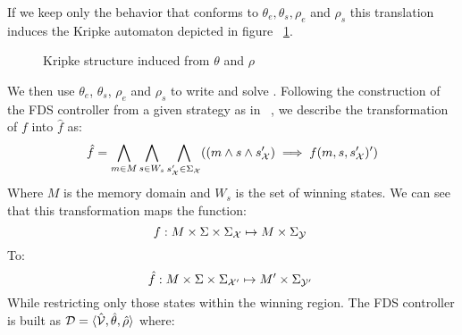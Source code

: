 \vspace{1em}
\normalsize

If we keep only the behavior that conforms to $\theta_e, \theta_s, \rho_e$ and $\rho_s$ this translation induces the Kripke automaton depicted in figure ~\ref{fig:clts_to_fds_K}.

\begin{figure}[bt]
	\centering
	\caption{Kripke structure induced from $\theta$ and $\rho$}
	\label{fig:clts_to_fds_K}
\end{figure}

We then use $\theta_e$, $\theta_s$, $\rho_e$ and $\rho_s$ to write \varphiLTL and solve \fdsEmbeddingDef. Following the construction of the FDS controller from a given strategy as in ~\cite{bloem2012synthesis}, we describe the transformation of $f$ into $\hat{f}$ as:
\[\hat{f} = \bigwedge_{m \in M}\bigwedge_{s \in W_s}\bigwedge_{s'_{{\mathcal{X}}} \in \Sigma_{{\mathcal{X}}}} ((m \wedge s \wedge s'_{{\mathcal{X}}})\implies f(m,s,s'_{{\mathcal{X}}})')\]
Where $M$ is the memory domain and $W_s$ is the set of winning states. We can see that this transformation maps the function:
\[f: M \times \Sigma \times \Sigma_{{\mathcal{X}}} \mapsto M \times \Sigma_{{\mathcal{Y}}}\ \]
To:
\[\hat{f}: M \times \Sigma \times \Sigma_{{\mathcal{X}}'} \mapsto M' \times \Sigma_{{\mathcal{Y}}'}\ \]
While restricting only those states within the winning region.
The FDS controller is built as $\mathcal{D} = \langle \hat{{\mathcal{V}}}, \hat{\theta}, \hat{\rho} \rangle$ where:

